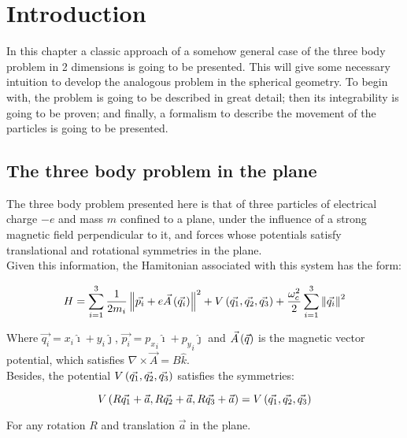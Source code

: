 \chapter{Introduction}

In this chapter a classic approach of a somehow general case of the three body problem in 2 dimensions is going to be presented. This will give some necessary intuition to develop the analogous problem in the spherical geometry. To begin with, the problem is going to be described in great detail; then its integrability is going to be proven; and finally, a formalism to describe the movement of the particles is going to be presented.\\

\section{The three body problem in the plane}

The three body problem presented here is that of three particles of electrical charge $-e$ and mass $m$ confined to a plane, under the influence of a strong magnetic field perpendicular to it, and forces whose potentials satisfy translational and rotational symmetries in the plane.\\

Given this information, the Hamitonian associated with this system has the form:

\begin{equation}
H = \sum_{i=1}^{3} \frac{1}{2m_i} \left\lVert \vec{p_i} + 
e\vec{ A } \left( \vec{q_i} \right)\right\rVert^2
+ V \left(  \vec{q_1},\vec{q_2},\vec{q_3}  \right)
+\frac{\omega_c^2}{2}\sum_{i=1}^{3} \left\lVert\vec{q_i}\right\rVert^2
\label{eq:ham2d}
\end{equation}

Where $\vec{q_i} = x_i \hat{\imath} + y_i \hat{\jmath}$, $\vec{p_i} = {p_x}_i\hat{\imath} + {p_y}_i\hat{\jmath}$ and $\vec{A}\left( \vec{q} \right)$ is the magnetic vector potential, which satisfies $\nabla \times \vec{A} = B\hat{k}$.\\

Besides, the potential $V \left(  \vec{q_1},\vec{q_2},\vec{q_3}  \right)$ satisfies the symmetries:

\begin{equation}
V \left(  R\vec{q_1}+\vec{a},R\vec{q_2}+\vec{a},R\vec{q_3}+\vec{a}   \right)= V \left(  \vec{q_1},\vec{q_2},\vec{q_3}  \right)
\end{equation}

For any rotation $R$ and translation $\vec{a}$ in the plane.\\

